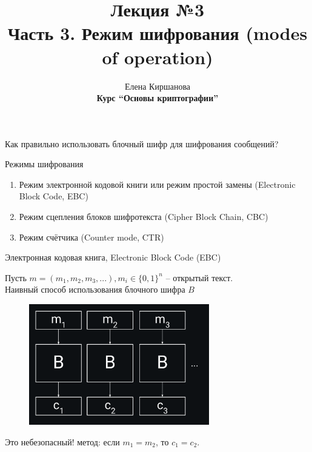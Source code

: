 \documentclass[usenames,dvipsnames,8pt,aspectratio=169]{beamer}
\title{Лекция №3 \\[10pt]
	Часть 3. Режим шифрования (modes of operation)}
\date{ Елена Киршанова \\  \textbf{Курс ``Основы криптографии''} \\  }
\begin{document}
	
\begin{frame}
	\titlepage
\end{frame}


\begin{frame}
	\Huge
	\centering
	{\color{Orange}Как правильно использовать блочный шифр для шифрования сообщений?} \\[10pt]
	
\end{frame}

\begin{frame}{Режимы шифрования}
\LARGE
\centering
\begin{enumerate} 
	\itemsep 10pt
	\item Режим электронной кодовой книги или режим простой замены (Electronic Block Code, EBC)
	\item Режим сцепления блоков шифротекста (Cipher Block Chain, CBC)
	\item Режим счётчика (Counter mode, CTR)
\end{enumerate}

\end{frame}

\begin{frame}{Электронная кодовая книга, Electronic Block Code (EBC)}

\Large
Пусть $m = (m_1, m_2, m_3, ...), m_i \in \{0,1\}^n$ -- открытый текст. \\[10pt]
Наивный способ  использования блочного шифра $B$
\begin{figure}
			\includegraphics[width=0.7\textwidth]{EBC}
	\end{figure}
\LARGE
Это {\color{Orange} небезопасный!} метод: \quad
если $m_1 = m_2$, то $c_1 = c_2$.

\end{frame}
\end{document}
